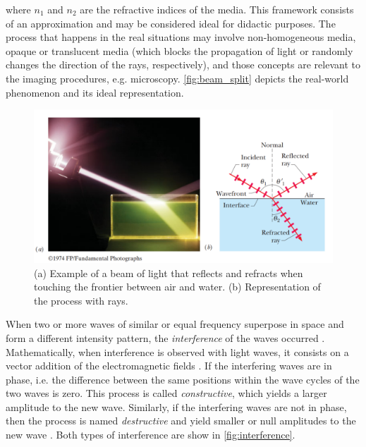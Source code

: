 \noindent where $\mathit{n_{1}}$ and $\mathit{n_{2}}$ are the refractive indices of the media. This framework consists of an approximation and may be considered ideal for didactic purposes. The process that happens in the real situations may involve non-homogeneous media, opaque or translucent media (which blocks the propagation of light or randomly changes the direction of the rays, respectively), and those concepts are relevant to the imaging procedures, e.g. microscopy. \autoref{fig:beam_split} depicts the real-world phenomenon and its ideal representation.

\begin{figure}[htb]
	\centering
	\caption{\label{fig:beam_split} 
	    (a) Example of a beam of light that reflects and refracts when touching the frontier between air and water. (b) Representation of the process with rays.}
	\begin{center}
	    \includegraphics[scale=0.3]{images/fig3.png}
	\end{center}
	\centering
\end{figure}

When two or more waves of similar or equal frequency superpose in space and form a different intensity pattern, the \emph{interference} of the waves occurred \cite{tipler2008physics}. Mathematically, when interference is observed with light waves, it consists on a vector addition of the electromagnetic fields \cite{zilio2009optica}. If the interfering waves are in phase, i.e. the difference between the same positions within the wave cycles of the two waves is zero. This process is called \emph{constructive}, which yields a larger amplitude to the new wave. Similarly, if the interfering waves are not in phase, then the process is named \emph{destructive} and yield smaller or null amplitudes to the new wave \cite{tipler2007physics}. Both types of interference are show in \autoref{fig:interference}.

